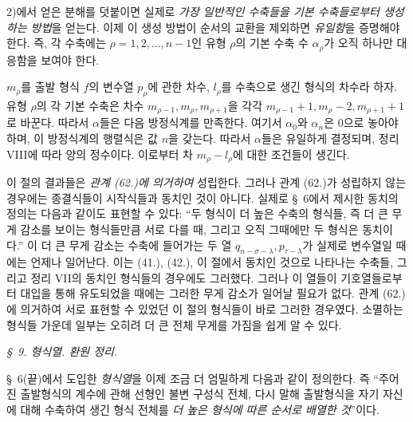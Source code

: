 2)에서 얻은 분해를 덧붙이면 실제로 \emph{가장 일반적인 수축들을 기본 수축들로부터 생성하는 방법}을 얻는다. 이제 이 생성 방법이 순서의 교환을 제외하면 \emph{유일함}을 증명해야 한다. 즉, 각 수축에는 $\rho=1,2,\ldots,n-1$인 유형 $\rho$의 기본 수축 수 $\alpha_\rho$가 오직 하나만 대응함을 보여야 한다.

$m_\rho$를 출발 형식 $f$의 변수열 $p_\rho$에 관한 차수, $l_\rho$를 수축으로 생긴 형식의 차수라 하자. 유형 $\rho$의 각 기본 수축은 차수 $m_{\rho-1},m_\rho,m_{\rho+1}$을 각각 $m_{\rho-1}+1,m_\rho-2,m_{\rho+1}+1$로 바꾼다. 따라서 $\alpha$들은 다음 방정식계를 만족한다.
여기서 $\alpha_0$와 $\alpha_n$은 0으로 놓아야 하며, 이 방정식계의 행렬식은 값 $n$을 갖는다. 따라서 $\alpha$들은 유일하게 결정되며, 정리 VIII에 따라 양의 정수이다. 이로부터 차 $m_\rho-l_\rho$에 대한 조건들이 생긴다.

이 절의 결과들은 \emph{관계 (62.)에 의거하여} 성립한다. 그러나 관계 (62.)가 성립하지 않는 경우에는 종결식들이 시작식들과 동치인 것이 아니다. 실제로 \S\ 6에서 제시한 동치의 정의는 다음과 같이도 표현할 수 있다: “두 형식이 더 높은 수축의 형식들, 즉 더 큰 무게 감소를 보이는 형식들만큼 서로 다를 때, 그리고 오직 그때에만 두 형식은 동치이다.” 이 더 큰 무게 감소는 수축에 들어가는 두 열 $q_{n-\sigma-\lambda},p_{\tau-\lambda}$가 실제로 변수열일 때에는 언제나 일어난다. 이는 (41.), (42.), 이 절에서 동치인 것으로 나타나는 수축들, 그리고 정리 VII의 동치인 형식들의 경우에도 그러했다. 그러나 이 열들이 기호열들로부터 대입을 통해 유도되었을 때에는 그러한 무게 감소가 일어날 필요가 없다. 관계 (62.)에 의거하여 서로 표현할 수 있었던 이 절의 형식들이 바로 그러한 경우였다. 소멸하는 형식들 가운데 일부는 오히려 더 큰 전체 무게를 가짐을 쉽게 알 수 있다.

\begin{center}
\emph{\S\ 9. 형식열. 환원 정리}.
\end{center}
\S\ 6(끝)에서 도입한 \emph{형식열}을 이제 조금 더 엄밀하게 다음과 같이 정의한다. 즉 “주어진 출발형식의 계수에 관해 선형인 불변 구성식 전체, 다시 말해 출발형식을 자기 자신에 대해 수축하여 생긴 형식 전체를 \emph{더 높은 형식에 따른 순서로 배열한 것}”이다.

